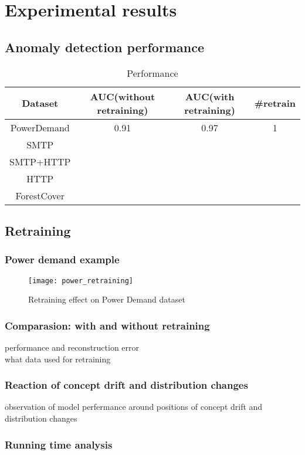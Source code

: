 \chapter{Experimental results}
\label{chap:results}


\section{Anomaly detection performance}
\label{sec:performance}


\begin{table}[h] 
\caption{Performance} 
\centering      
\begin{tabular}{c | c | c | c}  
\hline  
Dataset & AUC(without retraining) & AUC(with retraining) & \#retrain \\ 
\hline 
PowerDemand & 0.91 & 0.97 & 1  \\  
\hline 
SMTP &  &  &  \\ 
\hline 
SMTP+HTTP &  &  & \\ 
\hline 
HTTP &  &   &   \\ 
\hline 
ForestCover & &  & \\   
\hline    
\end{tabular}
\label{tab:auc}  
\end{table} 




\section{Retraining}
\label{sec:retraining}

\subsection{Power demand example}
\label{sec:example}

\begin{figure}[h]
\centering
\texttt{[image: power\_retraining]}
\caption[Retraining effect on Power Demand dataset]{Retraining effect on Power Demand dataset}
\label{fig:power_retraining}
\end{figure}



\subsection{Comparasion: with and without retraining}
\label{sec: compare}

performance and reconstruction error\\
what data used for retraining


\subsection{Reaction of concept drift and distribution changes}
\label{sec:reaction}
observation of model perfermance around positions of concept drift and distribution changes 

\subsection{Running time analysis}
\label{sec:time}




